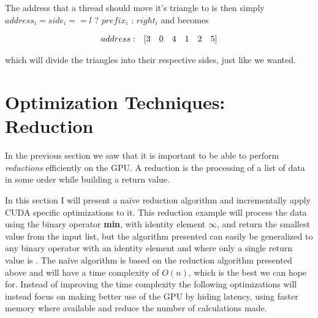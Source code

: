 The address that a thread should move it's triangle to is then simply
$address_i = side_i == l$ ? $prefix_i$ : $right_i$ and becomes


\begin{displaymath}
  \begin{array} {r r r r r r r}
    address: & [3 & 0 & 4 & 1 & 2 & 5]
  \end{array}
\end{displaymath}

which will divide the triangles into their respective sides, just like
we wanted.




\section{Optimization Techniques: Reduction}\label{sec:reduce}


In the previous section we saw that it is important to be able to
perform \textit{reductions} efficiently on the GPU. A reduction is the
processing of a list of data in some order while building a return
value.


In this section I will present a naïve reduction algorithm and
incrementally apply CUDA specific optimizations to it. This reduction
example will process the data using the binary operator \textbf{min},
with identity element $\infty$, and return the smallest value from the
input list, but the algorithm presented can easily be generalized to
any binary operator with an identity element and where only a single
return value is . The naïve algorithm is
based on the reduction algorithm presented above and will have a time
complexity of $O(n)$, which is the best we can hope for. Instead of
improving the time complexity the following optimizations will instead
focus on making better use of the GPU by hiding latency, using faster
memory where available and reduce the number of calculations made.


